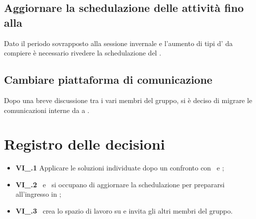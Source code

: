 \subsection{Aggiornare la schedulazione delle attività fino alla }
Dato il periodo sovrapposto alla sessione invernale e l'aumento di tipi d' da compiere è necessario rivedere la schedulazione del \PdP{}.
\subsection{Cambiare piattaforma di comunicazione}
Dopo una breve discussione tra i vari membri del gruppo, si è deciso di migrare le comunicazioni interne da  a .

\section{Registro delle decisioni}
\begin{itemize}
  \item \textbf{VI\_\Data.1} Applicare le soluzioni individuate dopo un confronto con \VT\ e \CR;
  \item \textbf{VI\_\Data.2} \MM\ e \TL\ si occupano di aggiornare la schedulazione per prepararsi all'ingresso in ;
  \item \textbf{VI\_\Data.3} \FF\ crea lo spazio di lavoro su  e invita gli altri membri del gruppo.
\end{itemize}